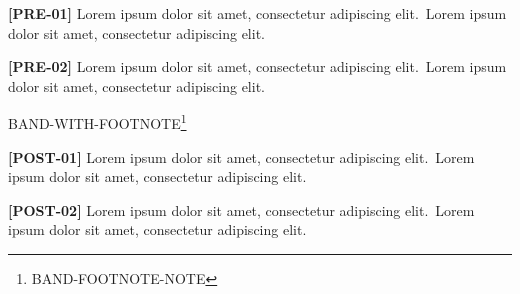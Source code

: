 \documentclass[twocolumn]{article}
\newcommand\Body{Lorem ipsum dolor sit amet, consectetur adipiscing elit.}
\newcommand\Par[1]{\par\textbf{[#1]} \Body\ \Body\par\medskip}
\begin{document}
\Par{PRE-01}\Par{PRE-02}
\begin{wideband}[rules=none]
  \centering BAND-WITH-FOOTNOTE\footnote{BAND-FOOTNOTE-NOTE}
\end{wideband}
\Par{POST-01}\Par{POST-02}
\end{document}
